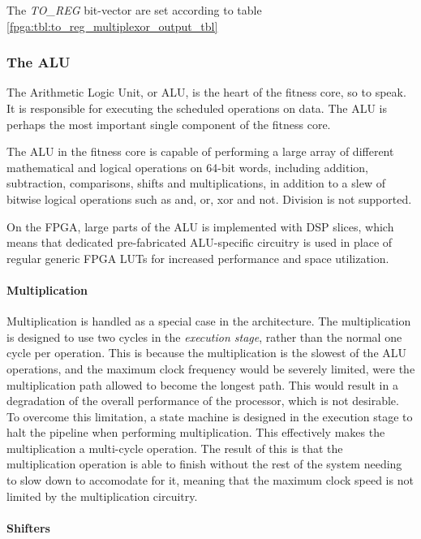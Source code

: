 The \emph{TO\_REG} bit-vector are set according to table \ref{fpga:tbl:to_reg_multiplexor_output_tbl}




\subsubsection{The ALU}

The Arithmetic Logic Unit, or ALU, is the heart of the fitness core, so to speak.
It is responsible for executing the scheduled operations on data.
The ALU is perhaps the most important single component of the fitness core.

The ALU in the fitness core is capable of performing a large array of different mathematical and logical operations on 64-bit words, including addition, subtraction, comparisons, shifts and multiplications, in addition to a slew of bitwise logical operations such as and, or, xor and not.
Division is not supported.

On the FPGA, large parts of the ALU is implemented with \glspl{DSP slice}, which means that dedicated pre-fabricated ALU-specific circuitry is used in place of regular generic \gls{FPGA} \glspl{LUT} for increased performance and space utilization.

\paragraph{Multiplication}

Multiplication is handled as a special case in the architecture.
The multiplication is designed to use two cycles in the \emph{execution stage}, rather than the normal one cycle per operation.
This is because the multiplication is the slowest of the ALU operations, and the maximum clock frequency would be severely limited, were the multiplication path allowed to become the longest path.
This would result in a degradation of the overall performance of the processor, which is not desirable.
To overcome this limitation, a state machine is designed in the execution stage to halt the pipeline when performing multiplication.
This effectively makes the multiplication a multi-cycle operation.
The result of this is that the multiplication operation is able to finish without the rest of the system needing to slow down to accomodate for it, meaning that the maximum clock speed is not limited by the multiplication circuitry.

\paragraph{Shifters}

